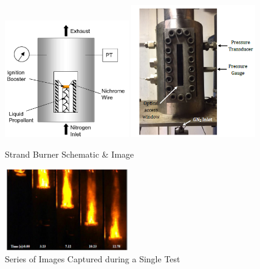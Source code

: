 \documentclass{article}
\begin{document}
\begin{figure}[htb]
\centering
\includegraphics[width=0.48\textwidth]{Strand_Burner_image_1.png}
\includegraphics[width=0.48\textwidth]{Strand_Burner_image_2.png}
\caption{Strand Burner Schematic \& Image}
\label{fig1}
\end{figure}

\begin{figure}[htb]
\centering
\includegraphics[width=0.48\textwidth]{Burn_Time_Elapse.png}
\caption{Series of Images Captured during a Single Test}
\label{fig2}
\end{figure}
\end{document}
